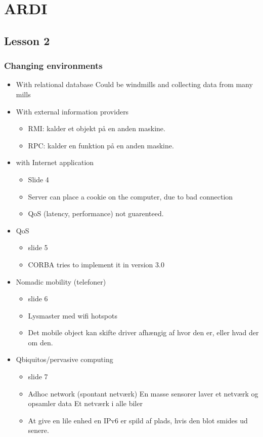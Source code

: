 \documentclass[10pt, a4]{Memoir}
\begin{document}
\chapter{ARDI}

\section{Lesson 2}

\subsection{Changing environments}
\begin{itemize}
\item With relational database
\subitem Could be windmills and collecting data from many mills

\item With external information providers
	\begin{itemize}
	\item RMI: kalder et objekt på en anden maskine.
	\item RPC: kalder en funktion på en anden maskine.
	\end{itemize}

\item with Internet application
	\begin{itemize}
	\item[] Slide 4
	\item Server can place a cookie on the computer, due to bad connection
	\item QoS (latency, performance) not guarenteed. 
	\end{itemize}

\item QoS
	\begin{itemize}
	\item slide 5
	\item CORBA tries to implement it in version 3.0
	\end{itemize}

\item Nomadic mobility (telefoner)
	\begin{itemize}
	\item slide 6
	\item Lysmaster med wifi hotspots
	\item Det mobile object kan skifte driver afhængig af hvor den er, eller hvad der om den.
	\end{itemize}

\item Qbiquitos/pervasive computing
	\begin{itemize}
	\item slide 7
	\item Adhoc network (spontant netværk)
	\subitem En masse sensorer laver et netværk og opsamler data 	
	\subitem Et netværk i alle biler
	\item At give en lile enhed en IPv6 er spild af plads, hvis den blot smides ud senere.
	\end{itemize}
\end{itemize}
\end{document}
